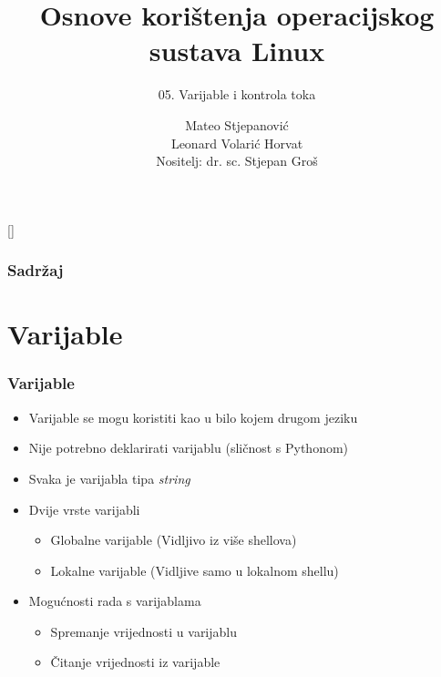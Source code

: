 \documentclass{beamer}
\title{Osnove korištenja operacijskog sustava Linux}
\subtitle{05. Varijable i kontrola toka}
\author[Mateo Stjepanović]{Mateo Stjepanović\\Leonard Volarić Horvat\\{\small Nositelj: dr. sc. Stjepan Groš}}
\institute[FER]{Sveučilište u Zagrebu \\
				Fakultet elektrotehnike i računarstva}
\date{\todayiso}
\begin{document}
{
[] %

\begin{frame}
\maketitle
\end{frame}
}

\begin{frame}
\frametitle{Sadržaj}
\tableofcontents
\end{frame}

\section{Varijable}
\begin{frame}[t]
\frametitle{Varijable}
\begin{itemize}
	\item Varijable se mogu koristiti kao u bilo kojem drugom jeziku
	\item Nije potrebno deklarirati varijablu (sličnost s Pythonom)
 	\item Svaka je varijabla tipa \textit{string}
	\item Dvije vrste varijabli
  	\begin{itemize}
  		\item Globalne varijable (Vidljivo iz više shellova)
  		\item Lokalne varijable (Vidljive samo u lokalnom shellu)
  	\end{itemize}
  
	\item Mogućnosti rada s varijablama
 	\begin{itemize}
 		\item Spremanje vrijednosti u varijablu
		\item Čitanje vrijednosti iz varijable
	\end{itemize}
\end{itemize}
\end{frame}
\end{document}
